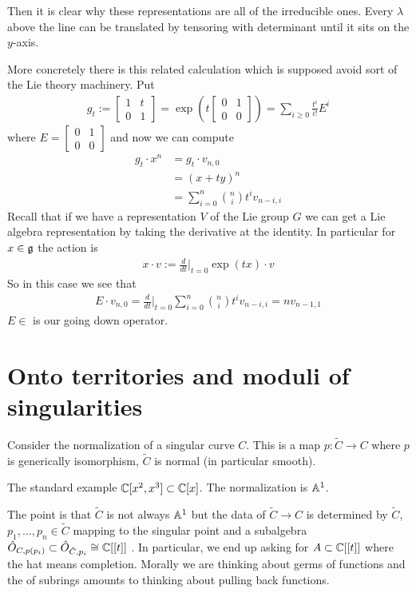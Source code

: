 \documentclass[12pt]{article}
\begin{document}
\hfill

Then it is clear why these representations are all of the irreducible ones. Every $\lambda$ above the line can
be translated by tensoring with determinant until it sits on the $y$-axis.

\hfill


More concretely there is this related calculation which is supposed avoid sort of the 
Lie theory machinery. Put
 \begin{align*}
    g_t := \begin{bmatrix}
        1 & t \\
        0 & 1
    \end{bmatrix} = \exp(t\begin{bmatrix}
        0 & 1 \\
        0 & 0
    \end{bmatrix}) = \sum_{i\geq 0 }\frac{t^i}{i!}E^i
\end{align*} where $E = \begin{bmatrix}
    0 & 1 \\
    0 & 0
\end{bmatrix}$ and now we can compute \begin{align*}
    g_t \cdot x^n &= g_t
    \cdot v_{n,0} \\
    &= (x+ty)^n \\
    &= \sum_{i=0}^n \binom{n}{i}t^i v_{n-i,i}
\end{align*} Recall that if we have a representation $V$ of the Lie group $G$ we can get 
a Lie algebra representation by taking the derivative at the identity. In particular for $x\in \mathfrak{g}$
the action is \begin{align*}
    x\cdot v := \frac{d}{dt}\bigg\vert_{t=0}\exp(tx)\cdot v
\end{align*} So in this case we see that \begin{align*}
    E\cdot v_{n,0} = \frac{d}{dt}\bigg\vert_{t=0}\sum_{i=0}^n \binom{n}{i}t^i v_{n-i,i} = nv_{n-1,1}
\end{align*} $E\in $ is our going down operator.

\section{Onto territories and moduli of singularities}
Consider the normalization of a singular curve $C$. This is a map $p:\tilde C\to C$ where $p$ is generically 
isomorphism, $\tilde{C}$ is normal (in particular smooth).
\begin{example}
    The standard example $\mathbb{C}[x^2,x^3]\subset \mathbb{C}[x]$. The normalization is $\mathbb{A}^1$.
\end{example}
The point is that $\tilde{C}$ is not always $\mathbb{A}^1$ but the data of $\tilde{C}\to C$ is 
determined by $\tilde C$, $p_1,\dots,p_n\in \tilde C$ mapping to the singular point
and a subalgebra $\hat{O}_{C,p(p_i)}\subset\hat{O}_{\tilde{C},p_i} \cong \mathbb{C}[[t]]$ . In particular, we end up asking for
$A\subset\mathbb{C}[[t]]$ where the hat means completion. Morally we are thinking about germs of functions and the 
of subrings amounts to thinking about pulling back functions.
\end{document}
